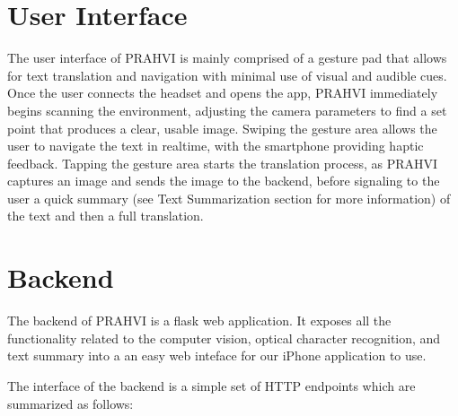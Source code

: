 \section{User Interface}
The user interface of PRAHVI is mainly comprised of a gesture pad that allows for text translation and navigation with minimal use of visual and audible cues. Once the user connects the headset and opens the app, PRAHVI immediately begins scanning the environment, adjusting the camera parameters to find a set point that produces a clear, usable image. Swiping the gesture area allows the user to navigate the text in realtime, with the smartphone providing haptic feedback. Tapping the gesture area starts the translation process, as PRAHVI captures an image and sends the image to the backend, before signaling to the user a quick summary (see Text Summarization section for more information) of the text and then a full translation.

\section{Backend}
The backend of PRAHVI is a flask web application. It exposes all the functionality related to the computer vision, optical character recognition, and text summary into a an easy web inteface for our iPhone application to use.

The interface of the backend is a simple set of HTTP endpoints which are summarized as follows:


